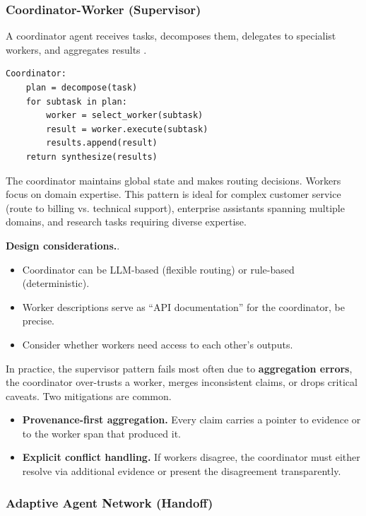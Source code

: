 \subsubsection{Coordinator-Worker (Supervisor)}

A coordinator agent receives tasks, decomposes them, delegates to specialist workers, and aggregates results \cite{googleadk2025}.

\begin{verbatim}
Coordinator:
    plan = decompose(task)
    for subtask in plan:
        worker = select_worker(subtask)
        result = worker.execute(subtask)
        results.append(result)
    return synthesize(results)
\end{verbatim}

The coordinator maintains global state and makes routing decisions. Workers focus on domain expertise. This pattern is ideal for complex customer service (route to billing vs. technical support), enterprise assistants spanning multiple domains, and research tasks requiring diverse expertise.

\textbf{Design considerations.}.
\begin{itemize}
\item Coordinator can be LLM-based (flexible routing) or rule-based (deterministic).
\item Worker descriptions serve as ``API documentation'' for the coordinator, be precise.
\item Consider whether workers need access to each other's outputs.
\end{itemize}

In practice, the supervisor pattern fails most often due to \textbf{aggregation errors}, the coordinator over-trusts a worker, merges inconsistent claims, or drops critical caveats. Two mitigations are common.
\begin{itemize}
\item \textbf{Provenance-first aggregation.} Every claim carries a pointer to evidence or to the worker span that produced it.
\item \textbf{Explicit conflict handling.} If workers disagree, the coordinator must either resolve via additional evidence or present the disagreement transparently.
\end{itemize}

\subsubsection{Adaptive Agent Network (Handoff)}

